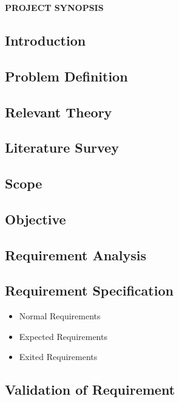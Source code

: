 \documentclass[10pt,a4paper]{article}
\begin{document}
\tableofcontents
\newpage
\begin{center}
\begin{huge}
\textbf{PROJECT SYNOPSIS}
\end{huge}
\end{center} 

\begin{large}
\section{Introduction}
\subsection{Problem Definition}
\subsection{Relevant Theory}
\subsection{Literature Survey}
\subsection{Scope}
\subsection{Objective}
\end{large}
 
\begin{large}
\section{Requirement Analysis}
\end{large}
	\subsection{Requirement Specification}
		\begin{itemize}
		\item Normal Requirements
		\item Expected Requirements
		\item Exited Requirements
		\end{itemize}
	\subsection{Validation of Requirement}
\end{document}

